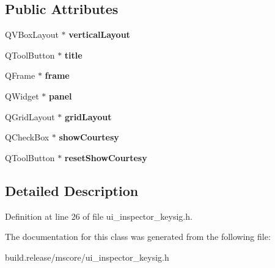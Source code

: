 \subsection*{Public Attributes}
\begin{DoxyCompactItemize}
\item 
\mbox{\label{class_ui___inspector_key_sig_a29275f57d75751fe5c3f2b2f8e454473}} 
Q\+V\+Box\+Layout $\ast$ {\bfseries vertical\+Layout}
\item 
\mbox{\label{class_ui___inspector_key_sig_a80c5ffde8484fab0c1a12d3b99ad55c4}} 
Q\+Tool\+Button $\ast$ {\bfseries title}
\item 
\mbox{\label{class_ui___inspector_key_sig_a27f27b38fc09270bd0bb4dcca2167803}} 
Q\+Frame $\ast$ {\bfseries frame}
\item 
\mbox{\label{class_ui___inspector_key_sig_ad890ea7fa0f2204f0b1ff86c50245fbb}} 
Q\+Widget $\ast$ {\bfseries panel}
\item 
\mbox{\label{class_ui___inspector_key_sig_aa4a8be5e5e4c88cd36ba5ae19d878600}} 
Q\+Grid\+Layout $\ast$ {\bfseries grid\+Layout}
\item 
\mbox{\label{class_ui___inspector_key_sig_afe09255460c3609e79a2aae14833dafa}} 
Q\+Check\+Box $\ast$ {\bfseries show\+Courtesy}
\item 
\mbox{\label{class_ui___inspector_key_sig_a1a0304accc6a227366459887f421f1d5}} 
Q\+Tool\+Button $\ast$ {\bfseries reset\+Show\+Courtesy}
\end{DoxyCompactItemize}


\subsection{Detailed Description}


Definition at line 26 of file ui\+\_\+inspector\+\_\+keysig.\+h.



The documentation for this class was generated from the following file\+:\begin{DoxyCompactItemize}
\item 
build.\+release/mscore/ui\+\_\+inspector\+\_\+keysig.\+h\end{DoxyCompactItemize}
